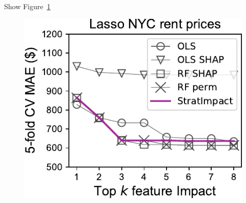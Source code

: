 \documentclass[twoside,11pt]{article}
\newcommand{\figref}[1]{Figure~\ref{#1}}
\begin{document}
Show \figref{fig:lasso}

\begin{figure}[htbp]
\begin{center}
\includegraphics[scale=0.65]{images/rent-topk-Lasso-Impact.pdf}
\label{fig:lasso}
\end{center}
\end{figure}
\end{document}
